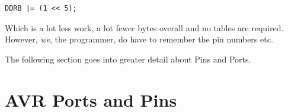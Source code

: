 \begin{lstlisting}[numbers={none}]
	DDRB |= (1 << 5);
\end{lstlisting}

Which is a lot less work, a lot fewer bytes overall and no tables are required. However, \emph{we}, the programmer, do have to remember the pin numbers etc.

The following section goes into greater detail about Pins and Ports.

\section{AVR Ports and Pins}\label{avr-ports-and-pins}

\section{}\label{}
